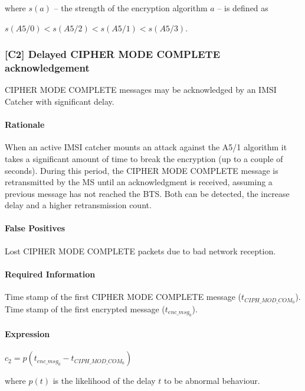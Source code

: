 \documentclass[a4paper,11pt,notitlepage,bigheadings,oneside]{scrartcl}
\begin{document}
where $s(a)$ -- the strength of the encryption algorithm $a$ -- is defined as

$s(A5/0) < s(A5/2) < s(A5/1) < s(A5/3)$.

\subsubsection{[C2] Delayed CIPHER MODE COMPLETE acknowledgement}

CIPHER MODE COMPLETE messages may be acknowledged by an IMSI Catcher with
significant delay.

\paragraph{Rationale}

When an active IMSI catcher mounts an attack against the A5/1 algorithm it
takes a significant amount of time to break the encryption (up to a couple of
seconds). During this period, the CIPHER MODE COMPLETE message is retransmitted
by the MS until an acknowledgment is received, assuming a previous message has
not reached the BTS. Both can be detected, the increase delay and a higher
retransmission count.

\paragraph{False Positives}

Lost CIPHER MODE COMPLETE packets due to bad network reception.

\paragraph{Required Information}

Time stamp of the first CIPHER MODE COMPLETE message ($t_{CIPH\_MOD\_COM_0}$).
Time stamp of the first encrypted message ($t_{enc\_msg_0}$).

\paragraph{Expression}

$c_2 = p(t_{enc\_msg_0} - t_{CIPH\_MOD\_COM_0})$

where $p(t)$ is the likelihood of the delay $t$ to be abnormal behaviour.

\end{document}
